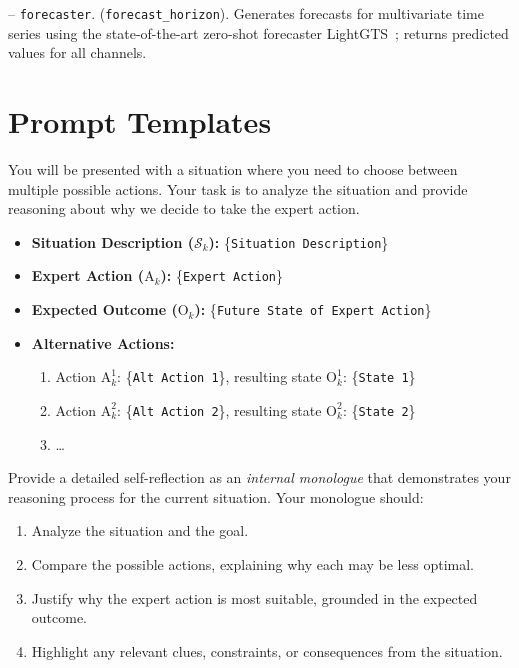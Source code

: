 \noindent-- \texttt{forecaster}. (\texttt{forecast\_horizon}). Generates forecasts for multivariate time series using the state-of-the-art zero-shot forecaster LightGTS~\citep{wang2025lightgts}; returns predicted values for all channels.

\clearpage
\section{Prompt Templates}
\label{app: prompt}

\begin{tcolorbox}[
  colback=white,
  colframe=black!50,
  boxrule=0.3mm,
  width=\columnwidth,
  rounded corners,
  title=Prompt 1: Making the self-reflections in Stage 3,
  fonttitle=\bfseries,
  left=2mm, right=2mm, top=2mm, bottom=2mm
]

You will be presented with a situation where you need to choose between multiple possible actions.
Your task is to analyze the situation and provide reasoning about why we decide to take the expert action.

\begin{itemize}[leftmargin=1em,labelsep=0.6em,itemsep=0.4ex,topsep=0.5ex]
  \item \textbf{Situation Description ($\mathcal{S}_k$):} \{\texttt{Situation Description}\}
  \item \textbf{Expert Action ($\mathrm{A}_k$):} \{\texttt{Expert Action}\}
  \item \textbf{Expected Outcome ($\mathrm{O}_k$):} \{\texttt{Future State of Expert Action}\}
  \item \textbf{Alternative Actions:}
    \begin{enumerate}[leftmargin=1em,labelsep=0.6em,itemsep=0.4ex,topsep=0.5ex]
      \item Action $\mathrm{A}_k^1$: \{\texttt{Alt Action 1}\}, resulting state $\mathrm{O}_k^1$: \{\texttt{State 1}\}
      \item Action $\mathrm{A}_k^2$: \{\texttt{Alt Action 2}\}, resulting state $\mathrm{O}_k^2$: \{\texttt{State 2}\}
      \item \dots
    \end{enumerate}
\end{itemize}

Provide a detailed self-reflection as an \emph{internal monologue} that demonstrates your reasoning process for the current situation.
Your monologue should:

\begin{enumerate}[leftmargin=2em,labelsep=0.6em,itemsep=0.4ex,topsep=0.5ex]
  \item Analyze the situation and the goal.
  \item Compare the possible actions, explaining why each may be less optimal.
  \item Justify why the expert action is most suitable, grounded in the expected outcome.
  \item Highlight any relevant clues, constraints, or consequences from the situation.
\end{enumerate}


\end{tcolorbox}
